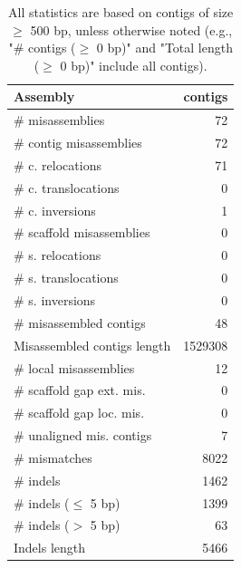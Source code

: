 \documentclass[12pt,a4paper]{article}
\begin{document}
\begin{table}[ht]
\begin{center}
\caption{All statistics are based on contigs of size $\geq$ 500 bp, unless otherwise noted (e.g., "\# contigs ($\geq$ 0 bp)" and "Total length ($\geq$ 0 bp)" include all contigs).}
\begin{tabular}{|l*{1}{|r}|}
\hline
Assembly & contigs \\ \hline
\# misassemblies & 72 \\ \hline
\hspace{2mm}\# contig misassemblies & 72 \\ \hline
\hspace{5mm}\# c. relocations & 71 \\ \hline
\hspace{5mm}\# c. translocations & 0 \\ \hline
\hspace{5mm}\# c. inversions & 1 \\ \hline
\hspace{2mm}\# scaffold misassemblies & 0 \\ \hline
\hspace{5mm}\# s. relocations & 0 \\ \hline
\hspace{5mm}\# s. translocations & 0 \\ \hline
\hspace{5mm}\# s. inversions & 0 \\ \hline
\# misassembled contigs & 48 \\ \hline
Misassembled contigs length & 1529308 \\ \hline
\# local misassemblies & 12 \\ \hline
\# scaffold gap ext. mis. & 0 \\ \hline
\# scaffold gap loc. mis. & 0 \\ \hline
\# unaligned mis. contigs & 7 \\ \hline
\# mismatches & 8022 \\ \hline
\# indels & 1462 \\ \hline
\hspace{5mm}\# indels ($\leq$ 5 bp) & 1399 \\ \hline
\hspace{5mm}\# indels ($>$ 5 bp) & 63 \\ \hline
Indels length & 5466 \\ \hline
\end{tabular}
\end{center}
\end{table}
\end{document}
